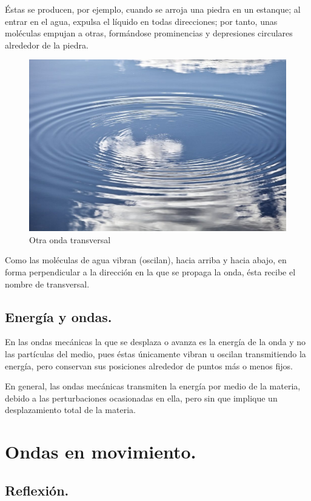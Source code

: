 \documentclass[12pt, letter]{article}
\begin{document}
Éstas se producen, por ejemplo, cuando se arroja una piedra en un estanque; al entrar en el agua, expulsa el líquido en todas direcciones; por tanto, unas moléculas empujan a otras, formándose prominencias y depresiones circulares alrededor de la piedra.
\begin{figure}[H]
    \centering
    \includegraphics[scale=0.25]{Imagenes/Ondas_06.jpg}
    \caption{Otra onda transversal}
\end{figure}

Como las moléculas de agua vibran (oscilan), hacia arriba y hacia abajo, en forma perpendicular a la dirección en la que se propaga la onda, ésta recibe el nombre de transversal.

\subsection{Energía y ondas.}

En las ondas mecánicas la que se desplaza o avanza es la energía de la onda y no las partículas del medio, pues éstas únicamente vibran u oscilan transmitiendo la energía, pero conservan sus posiciones alrededor de puntos más o menos fijos.

En general, las ondas mecánicas transmiten la energía por medio de la materia, debido a las perturbaciones ocasionadas en ella, pero sin que implique un desplazamiento total de la materia.

\section{Ondas en movimiento.}

\subsection{Reflexión.}
\end{document}

